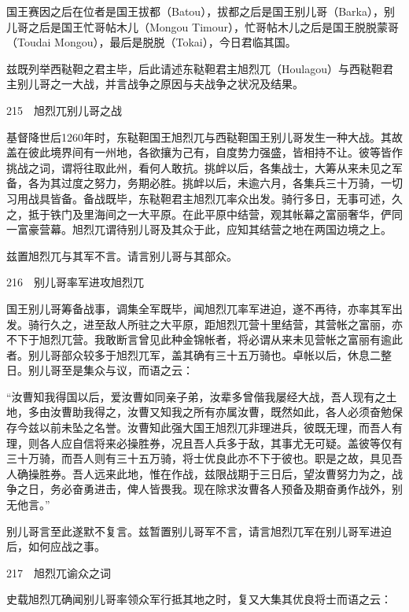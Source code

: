 \documentclass[12pt,UTF8]{ctexbook}
\begin{document}
国王赛因之后在位者是国王拔都（Batou），拔都之后是国王别儿哥（Barka），别儿哥之后是国王忙哥帖木儿（Mongou Timour），忙哥帖木儿之后是国王脱脱蒙哥（Toudai Mongou），最后是脱脱（Tokai），今日君临其国。

兹既列举西鞑靼之君主毕，后此请述东鞑靼君主旭烈兀（Houlagou）与西鞑靼君主别儿哥之一大战，并言战争之原因与夫战争之状况及结果。





215　旭烈兀别儿哥之战

基督降世后1260年时，东鞑靼国王旭烈兀与西鞑靼国王别儿哥发生一种大战。其故盖在彼此境界间有一州地，各欲攘为己有，自度势力强盛，皆相持不让。彼等皆作挑战之词，谓将往取此州，看何人敢抗。挑衅以后，各集战士，大筹从来未见之军备，各为其过度之努力，务期必胜。挑衅以后，未逾六月，各集兵三十万骑，一切习用战具皆备。备战既毕，东鞑靼君主旭烈兀率众出发。骑行多日，无事可述，久之，抵于铁门及里海间之一大平原。在此平原中结营，观其帐幕之富丽奢华，俨同一富豪营幕。旭烈兀谓待别儿哥及其众于此，应知其结营之地在两国边境之上。

兹置旭烈兀与其军不言。请言别儿哥与其部众。





216　别儿哥率军进攻旭烈兀

国王别儿哥筹备战事，调集全军既毕，闻旭烈兀率军进迫，遂不再待，亦率其军出发。骑行久之，进至敌人所驻之大平原，距旭烈兀营十里结营，其营帐之富丽，亦不下于旭烈兀营。我敢断言曾见此种金锦帐者，将必谓从来未见营帐之富丽有逾此者。别儿哥部众较多于旭烈兀军，盖其确有三十五万骑也。卓帐以后，休息二整日。别儿哥至是集众与议，而语之云：

“汝曹知我得国以后，爱汝曹如同亲子弟，汝辈多曾偕我屡经大战，吾人现有之土地，多由汝曹助我得之，汝曹又知我之所有亦属汝曹，既然如此，各人必须奋勉保存今兹以前未坠之名誉。汝曹知此强大国王旭烈兀非理进兵，彼既无理，而吾人有理，则各人应自信将来必操胜券，况且吾人兵多于敌，其事尤无可疑。盖彼等仅有三十万骑，而吾人则有三十五万骑，将士优良此亦不下于彼也。职是之故，具见吾人确操胜券。吾人远来此地，惟在作战，兹限战期于三日后，望汝曹努力为之，战争之日，务必奋勇进击，俾人皆畏我。现在除求汝曹各人预备及期奋勇作战外，别无他言。”

别儿哥言至此遂默不复言。兹暂置别儿哥军不言，请言旭烈兀军在别儿哥军进迫后，如何应战之事。





217　旭烈兀谕众之词

史载旭烈兀确闻别儿哥率领众军行抵其地之时，复又大集其优良将士而语之云：
\end{document}
